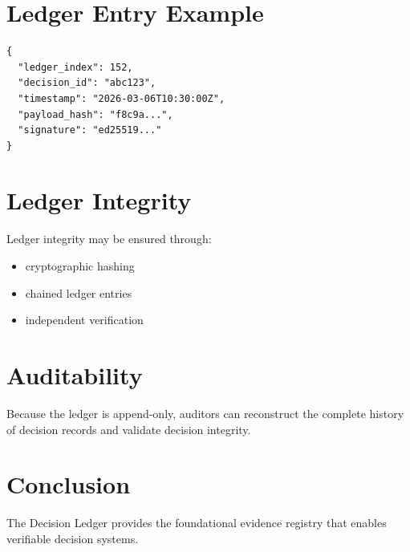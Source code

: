 \documentclass[11pt]{article}
\begin{document}
\section{Ledger Entry Example}

\begin{verbatim}
{
  "ledger_index": 152,
  "decision_id": "abc123",
  "timestamp": "2026-03-06T10:30:00Z",
  "payload_hash": "f8c9a...",
  "signature": "ed25519..."
}
\end{verbatim}

\section{Ledger Integrity}

Ledger integrity may be ensured through:

\begin{itemize}
\item cryptographic hashing
\item chained ledger entries
\item independent verification
\end{itemize}

\section{Auditability}

Because the ledger is append-only, auditors can reconstruct
the complete history of decision records and validate
decision integrity.

\section{Conclusion}

The Decision Ledger provides the foundational evidence
registry that enables verifiable decision systems.
\end{document}
